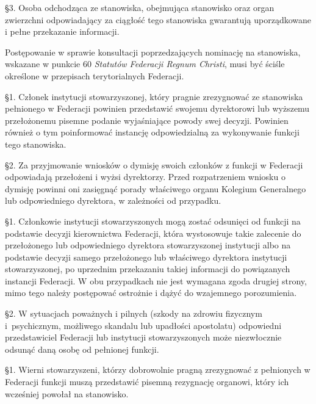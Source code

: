 \S{}3. Osoba odchodząca ze stanowiska, obejmująca stanowisko oraz organ zwierzchni odpowiadający za ciągłość tego stanowiska gwarantują uporządkowane i pełne przekazanie informacji.


 Postępowanie w sprawie konsultacji poprzedzających nominację na stanowiska, wskazane w punkcie 60 {\em Statutów Federacji Regnum Christi}, musi być ściśle określone w przepisach terytorialnych Federacji.

\filbreak{}

 \S{}1. Członek instytucji stowarzyszonej, który pragnie zrezygnować ze stanowiska pełnionego w Federacji powinien przedstawić swojemu dyrektorowi lub wyższemu przełożonemu pisemne podanie wyjaśniające powody swej decyzji. Powinien również o tym poinformować instancję odpowiedzialną za wykonywanie funkcji tego stanowiska.

\S{}2. Za przyjmowanie wniosków o dymisję swoich członków z funkcji w Federacji odpowiadają przełożeni i wyżsi dyrektorzy. Przed rozpatrzeniem wniosku o dymisję powinni oni zasięgnąć porady właściwego organu Kolegium Generalnego lub odpowiedniego dyrektora, w zależności od przypadku.


 \S{}1. Członkowie instytucji stowarzyszonych mogą zostać odsunięci od funkcji na podstawie decyzji kierownictwa Federacji, która wystosowuje takie zalecenie do przełożonego lub odpowiedniego dyrektora stowarzyszonej instytucji albo na podstawie decyzji samego przełożonego lub właściwego dyrektora instytucji stowarzyszonej, po uprzednim przekazaniu takiej informacji do powiązanych instancji Federacji. W obu przypadkach nie jest wymagana zgoda drugiej strony, mimo tego należy postępować ostrożnie i dążyć do wzajemnego porozumienia.

\S{}2. W sytuacjach poważnych i pilnych (szkody na zdrowiu fizycznym \mbox{i psychicznym}, możliwego skandalu lub upadłości apostolatu) odpowiedni przedstawiciel Federacji lub instytucji stowarzyszonych może niezwłocznie odsunąć daną osobę od pełnionej funkcji.

\filbreak{}

 \S{}1. Wierni stowarzyszeni, którzy dobrowolnie pragną zrezygnować z pełnionych w Federacji funkcji muszą przedstawić pisemną rezygnację organowi, który ich wcześniej powołał na stanowisko. 

